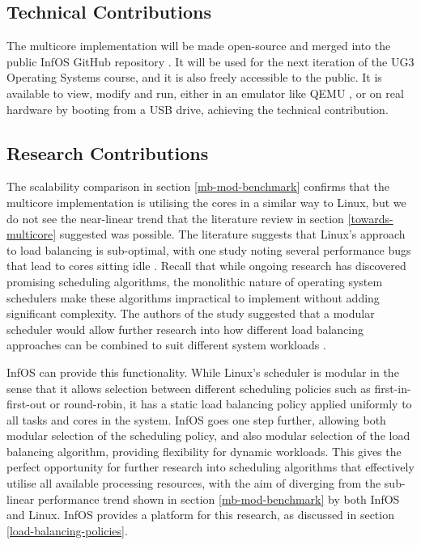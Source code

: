 \documentclass[bsc,frontabs,singlespacing,parskip,deptreport]{infthesis}
\begin{document}
\subsection{Technical Contributions}
The multicore implementation will be made open-source and merged into the public InfOS GitHub repository \cite{infos}. It will be used for the next iteration of the UG3 Operating Systems course, and it is also freely accessible to the public. It is available to view, modify and run, either in an emulator like QEMU \cite{qemu}, or on real hardware by booting from a USB drive, achieving the technical contribution.

\subsection{Research Contributions}
The scalability comparison in section \ref{mb-mod-benchmark} confirms that the multicore implementation is utilising the cores in a similar way to Linux, but we do not see the near-linear trend that the literature review in section \ref{towards-multicore} suggested was possible. The literature suggests that Linux's approach to load balancing is sub-optimal, with one study noting several performance bugs that lead to cores sitting idle \cite{wasted-cores}. Recall that while ongoing research has discovered promising scheduling algorithms, the monolithic nature of operating system schedulers make these algorithms impractical to implement without adding significant complexity. The authors of the study suggested that a modular scheduler would allow further research into how different load balancing approaches can be combined to suit different system workloads \cite{wasted-cores}.

InfOS can provide this functionality. While Linux's scheduler is modular in the sense that it allows selection between different scheduling policies such as first-in-first-out or round-robin, it has a static load balancing policy applied uniformly to all tasks and cores in the system. InfOS goes one step further, allowing both modular selection of the scheduling policy, and also modular selection of the load balancing algorithm, providing flexibility for dynamic workloads. This gives the perfect opportunity for further research into scheduling algorithms that effectively utilise all available processing resources, with the aim of diverging from the sub-linear performance trend shown in section \ref{mb-mod-benchmark} by both InfOS and Linux. InfOS provides a platform for this research, as discussed in section \ref{load-balancing-policies}.
\end{document}
